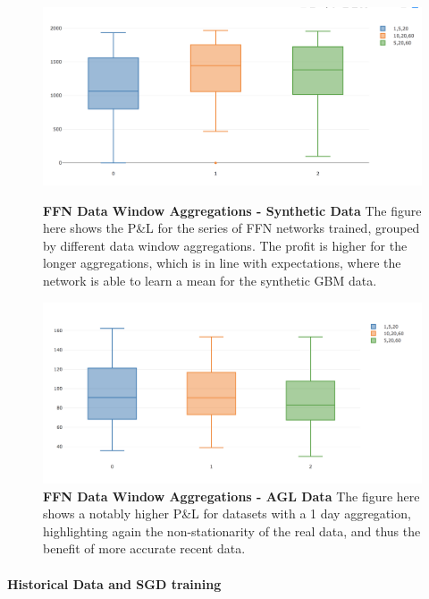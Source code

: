 \documentclass[a4paper,11pt,oneside]{article}
\theoremstyle{plain}
\theoremstyle{definition}
\begin{document}
\begin{figure}[H]
	\centering
	\begin{minipage}{0.45\textwidth}
		\centering 
		\includegraphics[scale=0.3]{images/iteration_four/it4_ffn_deltas.png}
		\caption{\textbf{FFN Data Window Aggregations - Synthetic Data} 
			\newline The figure here shows the P\&L for the series of FFN networks trained, grouped by different data window aggregations. The profit is higher for the longer aggregations, which is in line with expectations, where the network is able to learn a mean for the synthetic GBM data.}
		\label{figure-it5_ffn_deltas}
	\end{minipage}\hfill
	\begin{minipage}{0.45\textwidth}
		\centering \includegraphics[scale=0.3]{images/iteration_five/it5_delta_ffn.png}
		\caption{\textbf{FFN Data Window Aggregations - AGL Data} 
			\newline The figure here shows a notably higher P\&L for datasets with a 1 day aggregation, highlighting again the non-stationarity of the real data, and thus the benefit of more accurate recent data.}
		\label{figure-it5_delta_ffn}
	\end{minipage}
\end{figure}


\paragraph{Historical Data and SGD training}
\end{document}
